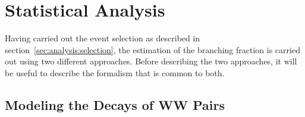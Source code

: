 \section{Statistical Analysis}
\label{sec:analysis:method}



Having carried out the event selection as described in section~\ref{sec:analysis:selection}, the estimation of the \PW branching fraction is carried out using two different approaches.  Before describing the two approaches, it will be useful to describe the formalism that is common to both.



\subsection{Modeling the Decays of WW Pairs}
\label{sec:analysis:method:effMatrix}


